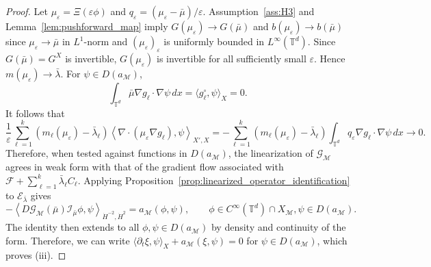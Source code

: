 \documentclass[11pt]{article}
\numberwithin{equation}{section}
\theoremstyle{definition}
\newcommand{\T}{\mathbb{T}}
\newcommand{\F}{\mathcal{F}}
\newcommand{\E}{\mathcal{E}}
\newcommand{\rieszmap}[1][\mu]{\mathcal{I}_{#1}}
\newcommand{\dotHk}[1][k]{\dot{H}^{#1}}
\begin{document}
\begin{proof}
    Let $\mu_\varepsilon = \Xi(\varepsilon\phi)$ and $q_\varepsilon = (\mu_\varepsilon - \bar\mu)/\varepsilon$. 
    Assumption~\ref{ass:H3} and Lemma~\ref{lem:pushforward_map} imply $G(\mu_\varepsilon) \to G(\bar\mu)$ and $b(\mu_\varepsilon) \to b(\bar\mu)$ since $\mu_{\varepsilon} \to \bar\mu$ in $L^1$-norm and $(\mu_\varepsilon)_{\varepsilon}$ is uniformly bounded in $L^{\infty}(\T^d)$.
    Since $G(\bar\mu) = G^X$ is invertible, $G(\mu_\varepsilon)$ is invertible for all sufficiently small $\varepsilon$.
    Hence $m(\mu_\varepsilon) \to \bar\lambda$.
    For $\psi \in D(a_{\mathcal{M}})$,
    \[
    \int_{\T^d} \bar\mu \nabla g_\ell \cdot \nabla\psi \, dx = \langle g_\ell^\circ,\psi\rangle_X = 0.
    \]
    It follows that
    \[
    \frac{1}{\varepsilon} \sum_{\ell=1}^k (m_\ell(\mu_\varepsilon) - \bar\lambda_\ell) \left\langle \nabla \cdot (\mu_\varepsilon \nabla g_\ell), \psi \right\rangle_{X',X} = -\sum_{\ell=1}^k (m_\ell(\mu_\varepsilon) - \bar\lambda_\ell) \int_{\T^d}q_\varepsilon \nabla g_\ell \cdot \nabla\psi\,dx \to 0.
    \]
    Therefore, when tested against functions in $D(a_{\mathcal{M}})$, the linearization of $\mathcal{G}_{\mathcal{M}}$ agrees in weak form with that of the gradient flow associated with $\F + \sum_{\ell=1}^k \bar\lambda_\ell C_\ell$.
    Applying Proposition~\ref{prop:linearized_operator_identification} to $\E_{\bar\lambda}$ gives
    \[
    -\left\langle D\mathcal{G}_{\mathcal{M}}(\bar\mu) \rieszmap[\bar\mu]\phi, \psi \right\rangle_{\dot{H}^{-2}, \dotHk[2]} = a_{\mathcal{M}}(\phi, \psi), \qquad \phi \in C^\infty(\T^d) \cap X_{\mathcal{M}}, \psi \in D(a_{\mathcal{M}}).
    \]
    The identity then extends to all $\phi, \psi \in D(a_{\mathcal{M}})$ by density and continuity of the form.
    Therefore, we can write $\langle \partial_t\xi, \psi\rangle_X + a_{\mathcal{M}}(\xi, \psi) = 0$ for $\psi \in D(a_{\mathcal{M}})$, which proves (iii).
\end{proof}
\end{document}
